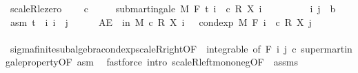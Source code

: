 \begin{isabellebody}
\isadelimproof
\isanewline
%
\endisadelimproof
\isanewline
{}\isamarkupfalse%
\ scaleR{\isacharunderscore}{\kern0pt}le{\isacharunderscore}{\kern0pt}zero{\isacharcolon}{\kern0pt}\ \isanewline
\ \ \ {\isachardoublequoteopen}c\ {\isasymle}\ {}{\isachardoublequoteclose}\isanewline
\ \ \ {\isachardoublequoteopen}submartingale\ M\ F\ t\ {\isacharparenleft}{\kern0pt}{\isasymlambda}i\ {\isasymxi}{\isachardot}{\kern0pt}\ c\ {\isacharasterisk}{\kern0pt}\isactrlsub R\ X\ i\ {\isasymxi}{\isacharparenright}{\kern0pt}{\isachardoublequoteclose}\isanewline
%
\isadelimproof
%
\endisadelimproof
%
\isatagproof
{}\isamarkupfalse%
\isanewline
\ \ \isacommand{{\isacharbraceleft}{\kern0pt}}\isamarkupfalse%
\isanewline
\ \ \ \ \isamarkupfalse%
\ i\ j\ {\isacharcolon}{\kern0pt}{\isacharcolon}{\kern0pt}\ {\isacharprime}{\kern0pt}b\ \isamarkupfalse%
\ asm{\isacharcolon}{\kern0pt}\ {\isachardoublequoteopen}t\ {\isasymle}\ i{\isachardoublequoteclose}\ {\isachardoublequoteopen}i\ {\isasymle}\ j{\isachardoublequoteclose}\isanewline
\ \ \ \ \isamarkupfalse%
\ {\isachardoublequoteopen}AE\ {\isasymxi}\ in\ M{\isachardot}{\kern0pt}\ c\ {\isacharasterisk}{\kern0pt}\isactrlsub R\ X\ i\ {\isasymxi}\ {\isasymle}\ cond{\isacharunderscore}{\kern0pt}exp\ M\ {\isacharparenleft}{\kern0pt}F\ i{\isacharparenright}{\kern0pt}\ {\isacharparenleft}{\kern0pt}{\isasymlambda}{\isasymxi}{\isachardot}{\kern0pt}\ c\ {\isacharasterisk}{\kern0pt}\isactrlsub R\ X\ j\ {\isasymxi}{\isacharparenright}{\kern0pt}\ {\isasymxi}{\isachardoublequoteclose}\ \isanewline
\ \ \ \ \ \ \isamarkupfalse%
\ sigma{\isacharunderscore}{\kern0pt}finite{\isacharunderscore}{\kern0pt}subalgebra{\isachardot}{\kern0pt}cond{\isacharunderscore}{\kern0pt}exp{\isacharunderscore}{\kern0pt}scaleR{\isacharunderscore}{\kern0pt}right{\isacharbrackleft}{\kern0pt}OF\ {\isacharunderscore}{\kern0pt}\ integrable{\isacharcomma}{\kern0pt}\ of\ {\isachardoublequoteopen}F\ i{\isachardoublequoteclose}\ j\ c{\isacharbrackright}{\kern0pt}\ supermartingale{\isacharunderscore}{\kern0pt}property{\isacharbrackleft}{\kern0pt}OF\ asm{\isacharbrackright}{\kern0pt}\ \isamarkupfalse%
\ {\isacharparenleft}{\kern0pt}fastforce\ intro{\isacharbang}{\kern0pt}{\isacharcolon}{\kern0pt}\ scaleR{\isacharunderscore}{\kern0pt}left{\isacharunderscore}{\kern0pt}mono{\isacharunderscore}{\kern0pt}neg{\isacharbrackleft}{\kern0pt}OF\ {\isacharunderscore}{\kern0pt}\ assms{\isacharbrackright}{\kern0pt}{\isacharparenright}{\kern0pt}\isanewline

\end{isabellebody}

